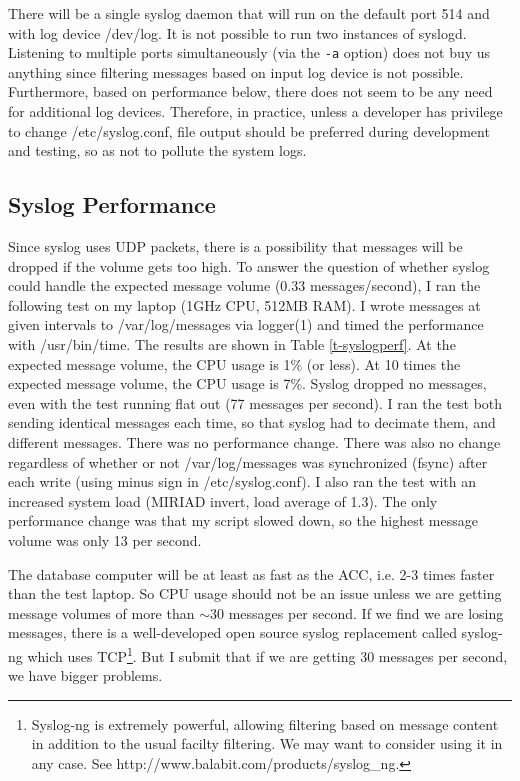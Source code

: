 \documentclass[preprint]{aastex}
\begin{document}
There will be a single syslog daemon that will run on the default
port 514 and with log device /dev/log.  It is not possible to run
two instances of syslogd. Listening to multiple ports simultaneously
(via the {\tt -a} option) does not buy us anything since filtering
messages based on input log device is not possible.  Furthermore,
based on performance below, there does not seem to be any need for
additional log devices.  Therefore, in practice, unless a developer
has privilege to change /etc/syslog.conf, file output should be
preferred during development and testing, so as not to pollute the
system logs.

\subsection{Syslog Performance\label{s-syslogperf}}
Since syslog uses UDP packets, there is a possibility that messages will
be dropped if the volume gets too high. To answer the question of whether 
syslog could handle the expected
message volume (0.33 messages/second), I ran the following test on my 
laptop (1GHz CPU, 512MB RAM).
I wrote messages at given intervals to /var/log/messages via logger(1) and
timed the performance with /usr/bin/time. 
The results are shown in 
Table \ref{t-syslogperf}.  At the expected message volume, the CPU usage 
is 1\% (or less). At 10 times the expected message volume, the CPU usage
is 7\%.  Syslog dropped no messages, even with the test running flat out 
(77 messages per second). 
I ran the test both sending identical messages each time, so that syslog had
to decimate them, and different messages.  
There was no performance change.
There was also no change regardless of whether or not
/var/log/messages was synchronized (fsync) after each write 
(using minus sign in /etc/syslog.conf).  
I also ran the test with an
increased system load  (MIRIAD invert, load average of 1.3).  The only
performance change was that my script slowed down, so the highest message volume
was only 13 per second.  

The database computer will be at least as fast as the ACC, i.e. 2-3 times
faster than the test laptop.  So CPU usage should not be an issue unless
we are getting message volumes of more than $\sim$30 messages per second.
If we find we are losing messages, there is a well-developed open source 
syslog replacement called syslog-ng which uses TCP\footnote{Syslog-ng 
is extremely powerful, allowing filtering based on message content in addition to the usual facilty filtering. We may want to consider using it in any case. See
http://www.balabit.com/products/syslog\_ng.}.
But I submit that if we are getting 30 messages per second, we have
bigger problems.
\end{document}
